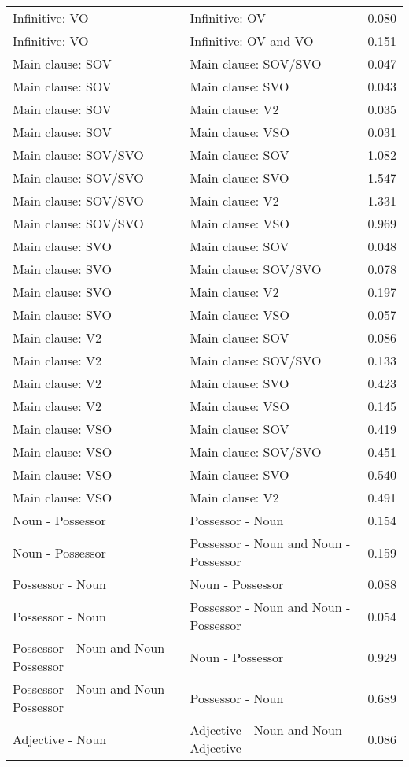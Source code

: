 \begin{longtable}{p{.4\linewidth}p{.4\linewidth}p{.1\linewidth}}
Infinitive: VO & Infinitive: OV & 0.080\\
Infinitive: VO & Infinitive: OV and VO & 0.151\\
Main clause: SOV & Main clause: SOV/SVO & 0.047\\
Main clause: SOV & Main clause: SVO & 0.043\\
Main clause: SOV & Main clause: V2 & 0.035\\
Main clause: SOV & Main clause: VSO & 0.031\\
Main clause: SOV/SVO & Main clause: SOV & 1.082\\
Main clause: SOV/SVO & Main clause: SVO & 1.547\\
Main clause: SOV/SVO & Main clause: V2 & 1.331\\
Main clause: SOV/SVO & Main clause: VSO & 0.969\\
Main clause: SVO & Main clause: SOV & 0.048\\
Main clause: SVO & Main clause: SOV/SVO & 0.078\\
Main clause: SVO & Main clause: V2 & 0.197\\
Main clause: SVO & Main clause: VSO & 0.057\\
Main clause: V2 & Main clause: SOV & 0.086\\
Main clause: V2 & Main clause: SOV/SVO & 0.133\\
Main clause: V2 & Main clause: SVO & 0.423\\
Main clause: V2 & Main clause: VSO & 0.145\\
Main clause: VSO & Main clause: SOV & 0.419\\
Main clause: VSO & Main clause: SOV/SVO & 0.451\\
Main clause: VSO & Main clause: SVO & 0.540\\
Main clause: VSO & Main clause: V2 & 0.491\\
Noun - Possessor & Possessor - Noun & 0.154\\
Noun - Possessor & Possessor - Noun and Noun - Possessor & 0.159\\
Possessor - Noun & Noun - Possessor & 0.088\\
Possessor - Noun & Possessor - Noun and Noun - Possessor & 0.054\\
Possessor - Noun and Noun - Possessor & Noun - Possessor & 0.929\\
Possessor - Noun and Noun - Possessor & Possessor - Noun & 0.689\\
Adjective - Noun & Adjective - Noun and Noun - Adjective & 0.086\\

\end{longtable}
